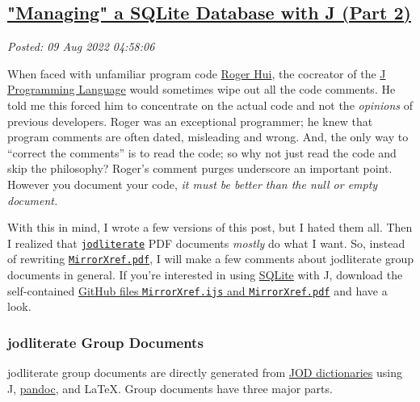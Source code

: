 %

\subsection*{\href{http://analyzethedatanotthedrivel.org/2022/08/08/managing-a-sqlite-database-with-j-part-2/}{"Managing" a SQLite Database with J (Part 2)}}


\noindent\emph{Posted: 09 Aug 2022 04:58:06}
\vspace{6pt}

When faced with unfamiliar program code
\href{https://rogerhui.rip/}{Roger Hui}, the cocreator of the
\href{https://code2.jsoftware.com/wiki/Main_Page}{J Programming
Language} would sometimes wipe out all the code comments. He told me
this forced him to concentrate on the actual code and not the
\emph{opinions} of previous developers. Roger was an exceptional
programmer; he knew that program comments are often dated, misleading
and wrong. And, the only way to ``correct the comments'' is to read the
code; so why not just read the code and skip the philosophy? Roger's
comment purges underscore an important point. However you document your
code, \emph{it must be better than the null or empty document.}

With this in mind, I wrote a few versions of this post, but I hated them
all. Then I realized that
\href{https://github.com/bakerjd99/jacks/blob/master/jodliterate/UsingJodliterate.pdf}{\texttt{jodliterate}}
PDF documents \emph{mostly} do what I want. So, instead of rewriting
\href{https://github.com/bakerjd99/jacks/blob/master/mirrorxref/MirrorXref.pdf}{\texttt{MirrorXref.pdf}},
I will make a few comments about jodliterate group documents in general.
If you're interested in using
\href{https://sqlite.org/index.html}{SQLite} with J, download the
self-contained
\href{https://github.com/bakerjd99/jacks/tree/master/mirrorxref}{GitHub
files \texttt{MirrorXref.ijs} and \texttt{MirrorXref.pdf}} and have a look.

\subsubsection*{jodliterate Group Documents}%

jodliterate group documents are directly generated from
\href{https://analyzethedatanotthedrivel.org/the-jod-page/}{JOD
dictionaries} using J, \href{https://pandoc.org/}{pandoc}, and \LaTeX.
Group documents have three major parts.

